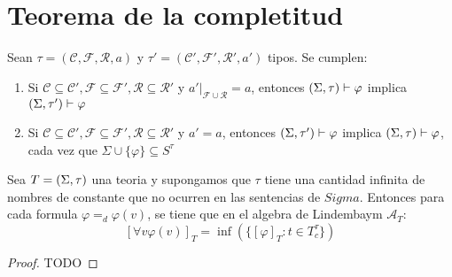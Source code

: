 


\section{Teorema de la completitud}

\begin{lemma}
  Sean $\tau=(\mathcal{C},\mathcal{F},\mathcal{R},a)$ y $\tau'=(\mathcal{C}',\mathcal{F}',\mathcal{R}',a')$ tipos. Se cumplen: \begin{enumerate}
    \item Si $\mathcal{C}\subseteq\mathcal{C}', \mathcal{F}\subseteq\mathcal{F}',\mathcal{R}\subseteq\mathcal{R}'$ y $a'|_{\mathcal{F}\cup\mathcal{R}}=a$,
    entonces $(\Sigma,\tau)\vdash\varphi$ implica $(\Sigma,\tau')\vdash\varphi$
    \item Si $\mathcal{C}\subseteq\mathcal{C}', \mathcal{F}\subseteq\mathcal{F}',\mathcal{R}\subseteq\mathcal{R}'$ y $a'=a$, entonces $(\Sigma,\tau')\vdash\varphi$
    implica $(\Sigma,\tau)\vdash\varphi$, cada vez que $\Sigma\cup\{\varphi\}\subseteq S^\tau$
  \end{enumerate} 
\end{lemma}
\noproof

\begin{lemma}
  Sea $T=(\Sigma,\tau)$ una teoria y supongamos que $\tau$ tiene una cantidad infinita de nombres de constante que no ocurren en las sentencias de $Sigma$.
  Entonces para cada formula $\varphi=_d\varphi(v)$, se tiene que en el algebra de Lindembaym $\mathcal{A}_T$:
  $$
  [\forall v\varphi(v)]_T=\inf(\{[\varphi]_T:t\in T_c^\tau\})
  $$
  
\end{lemma}
\begin{proof}
  TODO
\end{proof}

